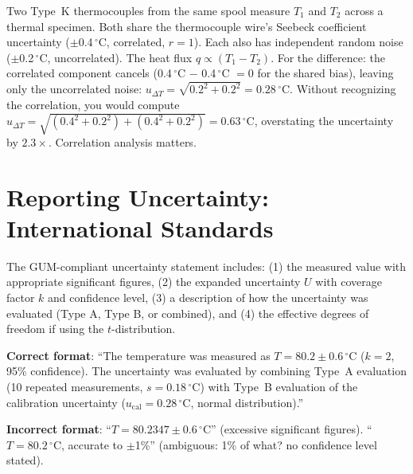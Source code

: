 \documentclass[11pt,letterpaper,twoside,openany]{book}
\newcommand{\degC}{\ensuremath{{}^{\circ}\text{C}}}
\begin{document}
\begin{examplebox}
Two Type~K thermocouples from the same spool measure $T_1$ and $T_2$ across a thermal specimen. Both share the thermocouple wire's Seebeck coefficient uncertainty ($\pm$0.4\,\degC{}, correlated, $r = 1$). Each also has independent random noise ($\pm$0.2\,\degC{}, uncorrelated). The heat flux $q \propto (T_1 - T_2)$. For the difference: the correlated component cancels (0.4\,\degC{} $-$ 0.4\,\degC{} $= 0$ for the shared bias), leaving only the uncorrelated noise: $u_{\Delta T} = \sqrt{0.2^2 + 0.2^2} = 0.28$\,\degC{}. Without recognizing the correlation, you would compute $u_{\Delta T} = \sqrt{(0.4^2+0.2^2) + (0.4^2+0.2^2)} = 0.63$\,\degC{}, overstating the uncertainty by $2.3\times$. Correlation analysis matters.
\end{examplebox}
\section{Reporting Uncertainty: International Standards}
The GUM-compliant uncertainty statement includes: (1) the measured value with appropriate significant figures, (2) the expanded uncertainty $U$ with coverage factor $k$ and confidence level, (3) a description of how the uncertainty was evaluated (Type A, Type B, or combined), and (4) the effective degrees of freedom if using the $t$-distribution.

\textbf{Correct format}: ``The temperature was measured as $T = 80.2 \pm 0.6$\,\degC{} ($k = 2$, 95\% confidence). The uncertainty was evaluated by combining Type~A evaluation (10 repeated measurements, $s = 0.18$\,\degC{}) with Type~B evaluation of the calibration uncertainty ($u_{\text{cal}} = 0.28$\,\degC{}, normal distribution).''

\textbf{Incorrect format}: ``$T = 80.2347 \pm 0.6$\,\degC{}'' (excessive significant figures). ``$T = 80.2$\,\degC{}, accurate to $\pm$1\%'' (ambiguous: 1\% of what? no confidence level stated).
\end{document}
